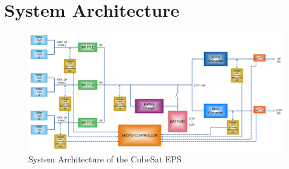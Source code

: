 \chapter{System Architecture}

\begin{figure}[h]
	\centering
	\includegraphics[width=\columnwidth]{diag1.pdf}
	\caption{System Architecture of the CubeSat EPS}
	\label{fig:arch}
\end{figure} 
